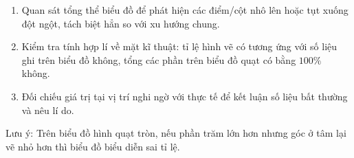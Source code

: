 \begin{enumerate}
\item Quan sát tổng thể biểu đồ để phát hiện các điểm/cột nhô lên hoặc tụt xuống đột ngột, tách biệt hẳn so với xu hướng chung.
\item Kiểm tra tính hợp lí về mặt kĩ thuật: tỉ lệ hình vẽ có tương ứng với số liệu ghi trên biểu đồ không, tổng các phần trên biểu đồ quạt có bằng $100\%$ không.
\item Đối chiếu giá trị tại vị trí nghi ngờ với thực tế để kết luận số liệu bất thường và nêu lí do.
\end{enumerate}
Lưu ý: Trên biểu đồ hình quạt tròn, nếu phần trăm lớn hơn nhưng góc ở tâm lại vẽ nhỏ hơn thì biểu đồ biểu diễn sai tỉ lệ.
